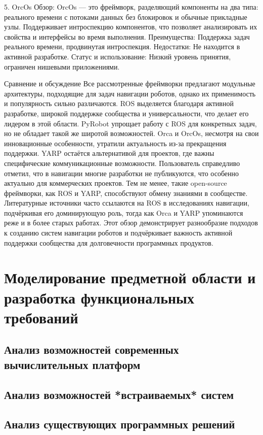 5. OrcOs
Обзор: OrcOs — это фреймворк, разделяющий компоненты на два типа: реального
времени с потоками данных без блокировок и обычные прикладные узлы.
Поддерживает интроспекцию компонентов, что позволяет анализировать их
свойства и интерфейсы во время выполнения. Преимущества: Поддержка задач
реального времени, продвинутая интроспекция. Недостатки: Не находится в
активной разработке. Статус и использование: Низкий уровень принятия,
ограничен нишевыми приложениями.

Сравнение и обсуждение Все рассмотренные фреймворки предлагают модульные
архитектуры, подходящие для задач навигации роботов, однако их применимость
и популярность сильно различаются. ROS выделяется благодаря активной
разработке, широкой поддержке сообщества и универсальности, что делает его
лидером в этой области. PyRobot упрощает работу с ROS для конкретных задач,
но не обладает такой же широтой возможностей. Orca и OrcOs, несмотря на свои
инновационные особенности, утратили актуальность из-за прекращения
поддержки. YARP остаётся альтернативой для проектов, где важны специфические
коммуникационные возможности. Пользователь справедливо отметил, что в
навигации многие разработки не публикуются, что особенно актуально для
коммерческих проектов. Тем не менее, такие open-source фреймворки, как ROS и
YARP, способствуют обмену знаниями в сообществе. Литературные источники
часто ссылаются на ROS в исследованиях навигации, подчёркивая его
доминирующую роль, тогда как Orca и YARP упоминаются реже и в более старых
работах. Этот обзор демонстрирует разнообразие подходов к созданию систем
навигации роботов и подчёркивает важность активной поддержки сообщества для
долговечности программных продуктов.

	\section{Моделирование предметной области и разработка функциональных
требований}
	\subsection{Анализ возможностей современных вычислительных платформ}
	\subsection{Анализ возможностей *встраиваемых* систем}
	\subsection{Анализ существующих программных решений}
